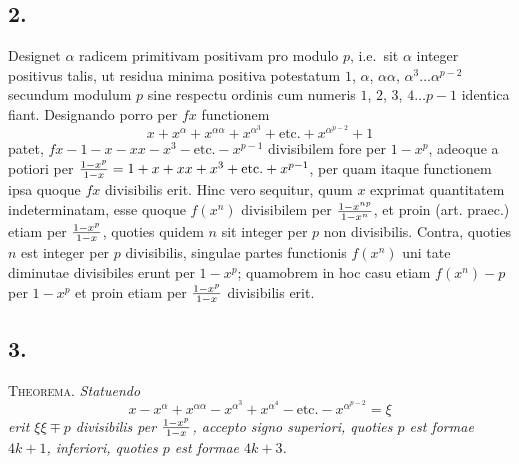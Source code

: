 \documentclass[twoside,12pt]{memoir}
\let\oldfrac\frac
\def\frac#1#2{\mathchoice{\tfrac{#1}{#2}}{\oldfrac{#1}{#2}}{\genfrac{}{}{}{2}{#1}{#2\mathstrut}}{\genfrac{}{}{}{3}{#1}{#2\mathstrut}}}
\begin{document}
\subsection*{2.}
 
Designet \(\alpha\) radicem primitivam positivam pro modulo \(p\), i.e.\ sit \(\alpha\) integer positivus talis, ut residua minima positiva potestatum \(1\), \(\alpha\), \(\alpha \alpha\), \(\alpha^{3} \ldots \alpha^{p-2}\) secundum modulum \(p\) sine respectu ordinis cum numeris \(1\), \(2\), \(3\), \(4 \ldots p-1\) identica fiant. Designando porro per \(f x\) functionem
\[x+x^{\alpha}+x^{\alpha \alpha}+x^{\alpha^{3}}+\text{etc.}+x^{\alpha^{p-2}}+1\]
patet, \(f x-1-x-x x-x^{3}-\text{etc.}-x^{p-1}\) divisibilem fore per \(1-x^{p}\), adeoque a potiori per \(\frac{1-x^{p}}{1-x}=1+x+x x+x^{3}+\text{etc.}+x^{p-1}\), per quam itaque functionem ipsa quoque \(f x\) divisibilis erit. Hinc vero sequitur, quum \(x\) exprimat quantitatem indeterminatam, esse quoque \(f(x^{n})\) divisibilem per \(\frac{1-x^{n p}}{1-x^{n}}\), et proin (art. praec.) etiam per \(\frac{1-x^{p}}{1-x}\), quoties quidem \(n\) sit integer per \(p\) non divisibilis. Contra, quoties \(n\) est integer per \(p\) divisibilis, singulae partes functionis \(f(x^{n})\) uni\pagebreak%
tate diminutae divisibiles erunt per \(1-x^{p}\); quamobrem in hoc casu etiam \(f(x^{n})-p\) per \(1-x^{p}\) et proin etiam per \(\frac{1-x^{p}}{1-x}\) divisibilis erit.

\subsection*{3.}
 
\textsc{Theorema.} \textit{Statuendo}
\[x-x^{\alpha}+x^{\alpha \alpha}-x^{\alpha^{3}}+x^{\alpha^{4}}-\text{etc.}-x^{\alpha^{p-2}}=\xi\]
\textit{erit \(\xi \xi \mp p\) divisibilis per \(\frac{1-x^{p}}{1- x}\), accepto signo superiori, quoties \(p\) est formae \(4 k+1\), inferiori, quoties \(p\) est formae \(4 k+3\).}
 
\end{document}
